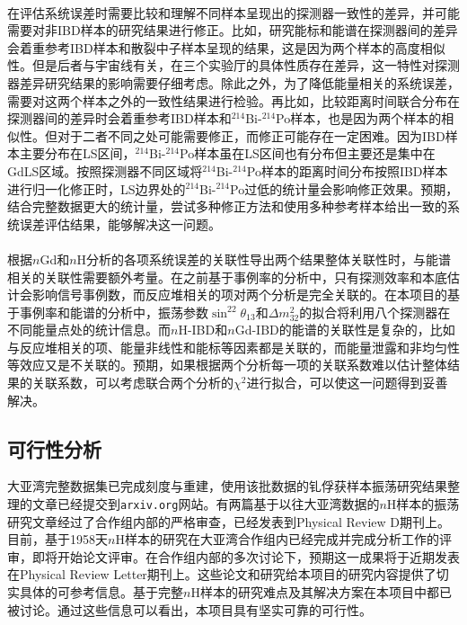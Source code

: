 \documentclass[a4paper,zihao=-4]{article}
\begin{document}
\paragraph{}在评估系统误差时需要比较和理解不同样本呈现出的探测器一致性的差异，并可能需要对非IBD样本的研究结果进行修正。比如，研究能标和能谱在探测器间的差异会着重参考IBD样本和散裂中子样本呈现的结果，这是因为两个样本的高度相似性。但是后者与宇宙线有关，在三个实验厅的具体性质存在差异，这一特性对探测器差异研究结果的影响需要仔细考虑。除此之外，为了降低能量相关的系统误差，需要对这两个样本之外的一致性结果进行检验。再比如，比较距离时间联合分布在探测器间的差异时会着重参考IBD样本和$^{214}$Bi-$^{214}$Po样本，也是因为两个样本的相似性。但对于二者不同之处可能需要修正，而修正可能存在一定困难。因为IBD样本主要分布在LS区间，$^{214}$Bi-$^{214}$Po样本虽在LS区间也有分布但主要还是集中在GdLS区域。按照探测器不同区域将$^{214}$Bi-$^{214}$Po样本的距离时间分布按照IBD样本进行归一化修正时，LS边界处的$^{214}$Bi-$^{214}$Po过低的统计量会影响修正效果。预期，结合完整数据更大的统计量，尝试多种修正方法和使用多种参考样本给出一致的系统误差评估结果，能够解决这一问题。
 \paragraph{}根据$n$Gd和$n$H分析的各项系统误差的关联性导出两个结果整体关联性时，与能谱相关的关联性需要额外考量。在之前基于事例率的分析中，只有探测效率和本底估计会影响信号事例数，而反应堆相关的项对两个分析是完全关联的。在本项目的基于事例率和能谱的分析中，振荡参数$\sin^22\theta_{13}$和$\Delta m_{32}^2$的拟合将利用八个探测器在不同能量点处的统计信息。而$n$H-IBD和$n$Gd-IBD的能谱的关联性是复杂的，比如与反应堆相关的项、能量非线性和能标等因素都是关联的，而能量泄露和非均匀性等效应又是不关联的。预期，如果根据两个分析每一项的关联系数难以估计整体结果的关联系数，可以考虑联合两个分析的$\chi^2$进行拟合，可以使这一问题得到妥善解决。

\subsection{可行性分析}

大亚湾完整数据集已完成刻度与重建，使用该批数据的钆俘获样本振荡研究结果整理的文章已经提交到\texttt{arxiv.org}网站。有两篇基于以往大亚湾数据的$n$H样本的振荡研究文章经过了合作组内部的严格审查，已经发表到Physical Review D期刊上。目前，基于1958天$n$H样本的研究在大亚湾合作组内已经完成并完成分析工作的评审，即将开始论文评审。在合作组内部的多次讨论下，预期这一成果将于近期发表在Physical Review Letter期刊上。这些论文和研究给本项目的研究内容提供了切实具体的可参考信息。基于完整$n$H样本的研究难点及其解决方案在本项目中都已被讨论。通过这些信息可以看出，本项目具有坚实可靠的可行性。
\end{document}

